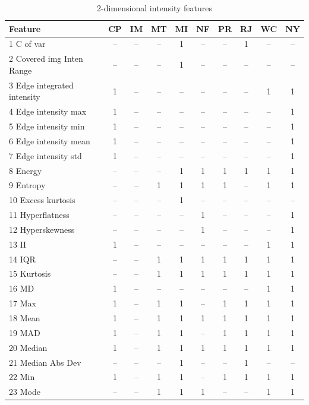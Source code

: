 \documentclass[sn-mathphys,Numbered]{sn-jnl}%
\theoremstyle{thmstyleone}%
\theoremstyle{thmstyletwo}%
\theoremstyle{thmstylethree}%
\begin{document}
\begin{table} [!hbt]
\centering
\caption {2-dimensional intensity features}
\label {table:INTEN}
\begin{tiny}
\begin{tabular} { l  c  c  c  c  c  c  c  c  c  }
\toprule

 Feature & CP &  IM &  MT &  MI &  NF &  PR &  RJ & WC & NY \\
 \midrule
1 C of var & -- & -- & -- & 1 & -- & -- & 1 & -- & -- \\
2 Covered img Inten Range & -- & -- & -- & 1 & -- & -- & -- & -- & -- \\
3 Edge integrated intensity & 1 & -- & -- & -- & -- & -- & -- & 1 & 1 \\
4 Edge intensity max & 1 & -- & -- & -- & -- & -- & -- & -- & 1 \\
5 Edge intensity min & 1 & -- & -- & -- & -- & -- & -- & -- & 1 \\
6 Edge intensity mean & 1 & -- & -- & -- & -- & -- & -- & -- & 1 \\
7 Edge intensity std & 1 & -- & -- & -- & -- & -- & -- & -- & 1 \\
8 Energy & -- & -- & -- & 1 & 1 & 1 & 1 & 1 & 1 \\
9 Entropy & -- & -- & 1 & 1 & 1 & 1 & -- & 1 & 1 \\
10 Excess kurtosis & -- & -- & -- & 1 & -- & -- & -- & -- & -- \\
11 Hyperflatness & -- & -- & -- & -- & 1 & -- & -- & -- & 1 \\
12 Hyperskewness & -- & -- & -- & -- & 1 & -- & -- & -- & 1 \\
13 II & 1 & -- & -- & -- & -- & -- & -- & 1 & 1 \\
14 IQR & -- & -- & 1 & 1 & 1 & 1 & 1 & 1 & 1 \\
15 Kurtosis & -- & -- & 1 & 1 & 1 & 1 & 1 & 1 & 1 \\
16 MD & 1 & -- & -- & -- & -- & -- & -- & 1 & 1 \\
17 Max & 1 & -- & 1 & 1 & -- & 1 & 1 & 1 & 1 \\
18 Mean & 1 & -- & 1 & 1 & 1 & 1 & 1 & 1 & 1 \\
19 MAD & 1 & -- & 1 & 1 & -- & 1 & 1 & 1 & 1 \\
20 Median & 1 & -- & 1 & 1 & 1 & 1 & 1 & 1 & 1 \\
21 Median Abs Dev & -- & -- & -- & 1 & -- & -- & 1 & -- & -- \\
22 Min & 1 & -- & 1 & 1 & -- & 1 & 1 & 1 & 1 \\
23 Mode & -- & -- & 1 & 1 & 1 & -- & -- & 1 & 1 \\

\end{tabular}
\end{tiny}
\end{table}
\end{document}
